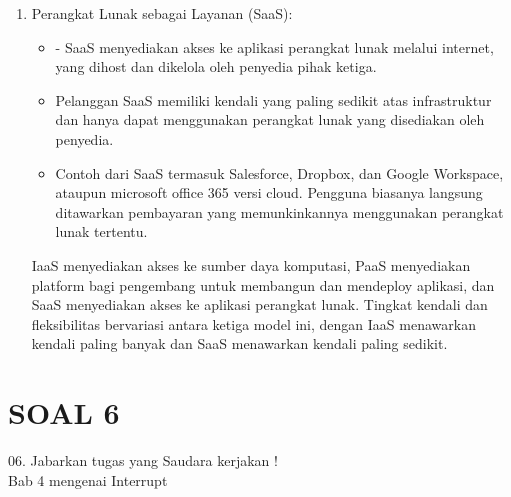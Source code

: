\documentclass{article}
\begin{document}
\begin{enumerate}
    
    \item  Perangkat Lunak sebagai Layanan (SaaS):
     \begin{itemize}
        \item - SaaS menyediakan akses ke aplikasi perangkat lunak melalui internet, yang dihost dan dikelola oleh penyedia pihak ketiga.
        \item Pelanggan SaaS memiliki kendali yang paling sedikit atas infrastruktur dan hanya dapat menggunakan perangkat lunak yang disediakan oleh penyedia.
        \item Contoh dari SaaS termasuk Salesforce, Dropbox, dan Google Workspace, ataupun microsoft office 365 versi cloud. Pengguna biasanya langsung ditawarkan pembayaran yang memunkinkannya menggunakan perangkat lunak tertentu.
     \end{itemize}
    

    
    

 IaaS menyediakan akses ke sumber daya komputasi, PaaS menyediakan platform bagi pengembang untuk membangun dan mendeploy aplikasi, dan SaaS menyediakan akses ke aplikasi perangkat lunak. Tingkat kendali dan fleksibilitas bervariasi antara ketiga model ini, dengan IaaS menawarkan kendali paling banyak dan SaaS menawarkan kendali paling sedikit.

\end{enumerate}
\section*{SOAL 6}
06. Jabarkan tugas yang Saudara kerjakan !\\

Bab 4 mengenai Interrupt
\end{document}
